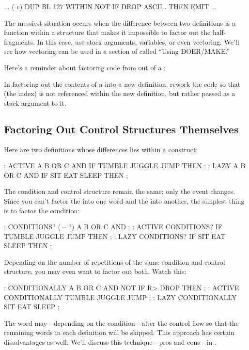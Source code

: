 \begin{Code}
... ( c)  DUP  BL 127 WITHIN NOT
       IF  DROP  ASCII .  THEN  EMIT  ...
\end{Code}
The messiest situation occurs when the difference between two
definitions is a function within a structure that makes it impossible
to factor out the half-fragments. In this case, use stack arguments,
variables, or even vectoring. We'll see how vectoring can be used in a
section of  called ``Using DOER/MAKE.''

Here's a reminder about factoring code from out of a :

\begin{tip}
In factoring out the contents of a  into a new
definition, rework the code so that  (the index) is not
referenced within the new definition, but rather passed as a stack
argument to it.
\end{tip}

\subsection{Factoring Out Control Structures Themselves}

Here are two definitions whose differences lies within a 
 construct:

\begin{Code}
: ACTIVE    A B OR  C AND  IF  TUMBLE JUGGLE JUMP THEN ;
: LAZY      A B OR  C AND  IF   SIT  EAT  SLEEP   THEN ;
\end{Code}
The condition and control structure remain the same; only the event
changes. Since you can't factor the  into one word and the
 into another, the simplest thing is to factor the
condition:

\begin{Code}
: CONDITIONS? ( -- ?) A B OR C AND ;
: ACTIVE    CONDITIONS? IF TUMBLE JUGGLE JUMP THEN ;
: LAZY      CONDITIONS? IF    SIT  EAT  SLEEP THEN ;
\end{Code}

\noindent 
Depending on the number of repetitions of the same condition and
control structure, you may even want to factor out both. Watch this:

\begin{Code}
: CONDITIONALLY   A B OR  C AND NOT IF  R> DROP   THEN ;
: ACTIVE   CONDITIONALLY   TUMBLE JUGGLE JUMP ;
: LAZY   CONDITIONALLY  SIT  EAT  SLEEP ;
\end{Code}
The word  may---depending on the condition---alter
the control flow so that the remaining words in each definition will be
skipped. This approach has certain disadvantages as well. We'll
discuss this technique---pros and cons---in .

